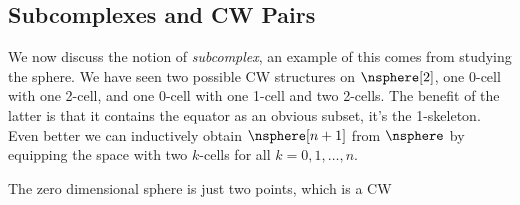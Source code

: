 \documentclass{book}                                                           %
\begin{document}
            \hfill
            \subsection{Subcomplexes and CW Pairs}
                \begin{minipage}[t]{0.6\textwidth}
                    We now discuss the notion of \textit{subcomplex}, an example
                    of this comes from studying the sphere. We have seen two
                    possible CW structures on $\nsphere[2]$, one 0-cell with one
                    2-cell, and one 0-cell with one 1-cell and two 2-cells.
                    The benefit of the latter is that it contains the equator as
                    an obvious subset, it's the 1-skeleton. Even better we can
                    inductively obtain $\nsphere[n+1]$ from $\nsphere$ by
                    equipping the space with two $k$-cells for all
                    $k=0,1,\dots,n$.
                \end{minipage}
                \hfill
                \par\vspace{2.5ex}
                The zero dimensional sphere is just two points, which is a CW
\end{document}
